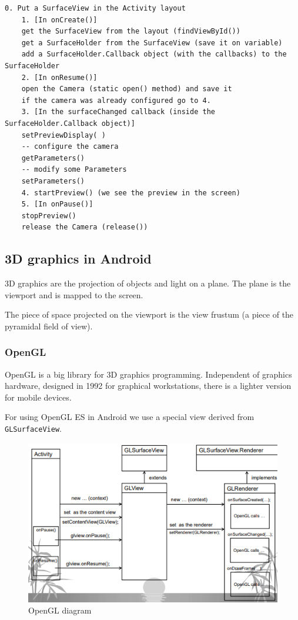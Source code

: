 \begin{lstlisting}[title=Steps]
    0. Put a SurfaceView in the Activity layout
    1. [In onCreate()]
    get the SurfaceView from the layout (findViewById())
    get a SurfaceHolder from the SurfaceView (save it on variable)
    add a SurfaceHolder.Callback object (with the callbacks) to the SurfaceHolder
    2. [In onResume()]
    open the Camera (static open() method) and save it
    if the camera was already configured go to 4.
    3. [In the surfaceChanged callback (inside the SurfaceHolder.Callback object)]
    setPreviewDisplay( )
    -- configure the camera
    getParameters()
    -- modify some Parameters
    setParameters()
    4. startPreview() (we see the preview in the screen)
    5. [In onPause()]
    stopPreview()
    release the Camera (release())
\end{lstlisting}


\subsection{3D graphics in Android}

3D graphics are the projection of objects and light on a plane.
The plane is the viewport and is mapped to the screen.

The piece of space projected on the viewport is the
view frustum (a piece of the pyramidal field of view).

\subsubsection{OpenGL}

OpenGL is a big library for 3D graphics programming.
Independent of graphics hardware, designed in 1992 for graphical workstations,
there is a lighter version for mobile devices. 

For using OpenGL ES in Android we use a special view derived from \texttt{GLSurfaceView}.

\begin{figure}[h]
\centering
\includegraphics[width=0.8\linewidth]{figures/08_opengl_diagram.png}
\caption{OpenGL diagram}
\label{fig:opengl_diagram}
\end{figure}

